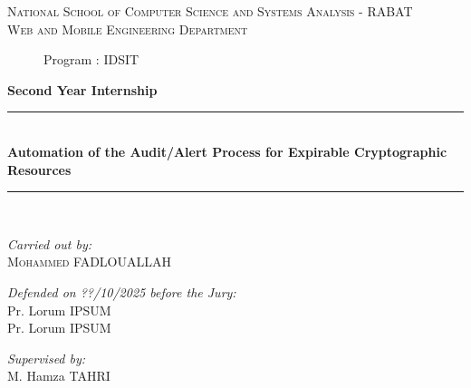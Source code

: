 \begin{titlepage}
\begin{center}
\textsc{\large National School of Computer Science and Systems Analysis - RABAT \\ [0.2cm] Web and Mobile Engineering Department}\\[0.8cm]

\begin{figure}[H]
    \begin{center}
        \large Program : IDSIT
    \end{center}
\end{figure}

{\LARGE \bfseries Second Year Internship\\[2cm]}

\textcolor{black}{\rule{\textwidth}{2pt}}\\[0.5cm]

{\LARGE \bfseries Automation of the Audit/Alert Process for Expirable Cryptographic Resources\\ [0.5cm]
}

\textcolor{black}{\rule{\textwidth}{2pt}}\\[0.5cm]
\vspace{2cm}

\begin{minipage}{0.36\textwidth}
\begin{flushleft} \large
\emph{Carried out by:}\\[0.4 cm]
\textsc{Mohammed} FADLOUALLAH\\
\end{flushleft}
\end{minipage}
\begin{minipage}{0.6\textwidth}
\begin{flushleft} \large
\emph { \hspace*{1.3cm}Defended on ??/10/2025 before the Jury:} \\[0.4 cm]
\hspace*{1.3cm} Pr. Lorum IPSUM \\ \hspace*{1.3cm} Pr. Lorum IPSUM
\end{flushleft}
\end{minipage}
\vspace{1.3cm}

\begin{minipage}{0.36\textwidth}
\begin{flushleft} \large
\end{flushleft}
\end{minipage}
\begin{minipage}{0.63\textwidth}
\begin{flushleft} \large
\emph{ \hspace*{1.3cm} Supervised by:}\\[0.4 cm] \hspace*{1.5cm} M. Hamza TAHRI\\
\end{flushleft}
\end{minipage}


\end{center}
\end{titlepage}
